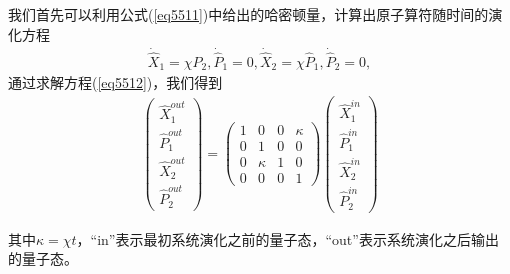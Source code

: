 我们首先可以利用公式(\ref{eq5511})中给出的哈密顿量，计算出原子算符随时间的演化方程
\begin{align}\label{eq5512}
	{{\dot {\hat{ X}}}_1} = \chi {{\hat P}_2},
	{{\dot {\hat{ P}}}_1} = 0 ,
	{{\dot {\hat{ X}}}_2} = \chi {{\hat P}_1},
	{{\dot {\hat{ P}}}_2} = 0,
\end{align}
通过求解方程(\ref{eq5512})，我们得到
\begin{align}\label{eq5513}
	\left( {\begin{array}{*{20}{c}}
			{\hat X_1^{out}}\\
			{\hat P_1^{out}}\\
			{\hat X_2^{out}}\\
			{\hat P_2^{out}}
	\end{array}} \right) = \left( {\begin{array}{*{20}{c}}
			1   & 0     & 0   & \kappa\\
			0   & 1     & 0   & 0     \\
			0   &\kappa & 1   & 0     \\
			0   & 0     & 0   & 1
	\end{array}} \right)\left( {\begin{array}{*{20}{c}}
			{\hat X_1^{in}}\\
			{\hat P_1^{in}}\\
			{\hat X_2^{in}}\\
			{\hat P_2^{in}}
	\end{array}} \right)
\end{align}

其中$\kappa=\chi t$，“in”表示最初系统演化之前的量子态，“out”表示系统演化之后输出的量子态。

